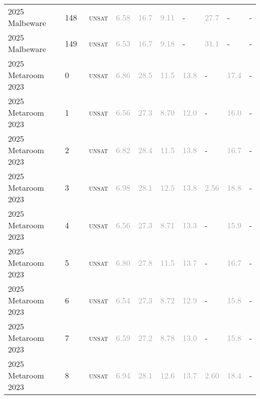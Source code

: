 \begin{center}
{\begin{longtable}{@{}llllllllll@{}}
2025 Malbeware & 148 & ~\textsc{unsat} & \textcolor{darkgray}{6.58} & \textcolor{darkgray}{16.7} & \textcolor{darkgray}{9.11} & - & \textcolor{darkgray}{27.7} & - & - \\
2025 Malbeware & 149 & ~\textsc{unsat} & \textcolor{darkgray}{6.53} & \textcolor{darkgray}{16.7} & \textcolor{darkgray}{9.18} & - & \textcolor{darkgray}{31.1} & - & - \\
\midrule
2025 Metaroom 2023 & 0 & ~\textsc{unsat} & \textcolor{darkgray}{6.86} & \textcolor{darkgray}{28.5} & \textcolor{darkgray}{11.5} & \textcolor{darkgray}{13.8} & - & \textcolor{darkgray}{17.4} & - \\
2025 Metaroom 2023 & 1 & ~\textsc{unsat} & \textcolor{darkgray}{6.56} & \textcolor{darkgray}{27.3} & \textcolor{darkgray}{8.70} & \textcolor{darkgray}{12.0} & - & \textcolor{darkgray}{16.0} & - \\
2025 Metaroom 2023 & 2 & ~\textsc{unsat} & \textcolor{darkgray}{6.82} & \textcolor{darkgray}{28.4} & \textcolor{darkgray}{11.5} & \textcolor{darkgray}{13.8} & - & \textcolor{darkgray}{16.7} & - \\
2025 Metaroom 2023 & 3 & ~\textsc{unsat} & \textcolor{darkgray}{6.98} & \textcolor{darkgray}{28.1} & \textcolor{darkgray}{12.5} & \textcolor{darkgray}{13.8} & \textcolor{darkgray}{2.56} & \textcolor{darkgray}{18.8} & - \\
2025 Metaroom 2023 & 4 & ~\textsc{unsat} & \textcolor{darkgray}{6.56} & \textcolor{darkgray}{27.3} & \textcolor{darkgray}{8.71} & \textcolor{darkgray}{13.3} & - & \textcolor{darkgray}{15.9} & - \\
2025 Metaroom 2023 & 5 & ~\textsc{unsat} & \textcolor{darkgray}{6.80} & \textcolor{darkgray}{27.8} & \textcolor{darkgray}{11.5} & \textcolor{darkgray}{13.7} & - & \textcolor{darkgray}{16.7} & - \\
2025 Metaroom 2023 & 6 & ~\textsc{unsat} & \textcolor{darkgray}{6.54} & \textcolor{darkgray}{27.3} & \textcolor{darkgray}{8.72} & \textcolor{darkgray}{12.9} & - & \textcolor{darkgray}{15.8} & - \\
2025 Metaroom 2023 & 7 & ~\textsc{unsat} & \textcolor{darkgray}{6.59} & \textcolor{darkgray}{27.2} & \textcolor{darkgray}{8.78} & \textcolor{darkgray}{13.0} & - & \textcolor{darkgray}{15.8} & - \\
2025 Metaroom 2023 & 8 & ~\textsc{unsat} & \textcolor{darkgray}{6.94} & \textcolor{darkgray}{28.1} & \textcolor{darkgray}{12.6} & \textcolor{darkgray}{13.7} & \textcolor{darkgray}{2.60} & \textcolor{darkgray}{18.4} & - \\

\end{longtable}}
\end{center}
